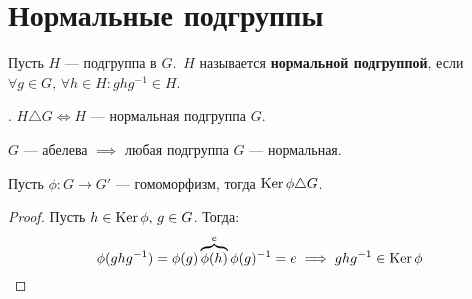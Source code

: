 \documentclass[../main.tex]{subfiles}
\begin{document}
\section{Нормальные подгруппы}
\begin{definition}
    Пусть $H$ --- подгруппа в $G$.\, $H$ называется \textbf{нормальной подгруппой}, если $\forall g \in G, \, \forall h \in H\colon ghg^{-1} \in H$.
\end{definition}
. $H \triangle G \iff H$ --- нормальная подгруппа $G$.
\begin{remark}
    $G$ --- абелева $\implies$ любая подгруппа $G$ --- нормальная.
\end{remark}

\begin{theorem-non}
    Пусть $\phi\colon G \to G'$ --- гомоморфизм, тогда $\operatorname{Ker} \phi \triangle G$.
\end{theorem-non}
\begin{proof}
    Пусть $h \in \operatorname{Ker} \phi, \, g \in G$. Тогда:
    \begin{equation*}
        \phi(ghg^{-1}) = \phi(g) \overbrace{\phi(h)}^{\mathclap{e}} \phi(g)^{-1} = e
        \implies ghg^{-1} \in \Ker \phi
    \end{equation*}
\end{proof}
\end{document}
